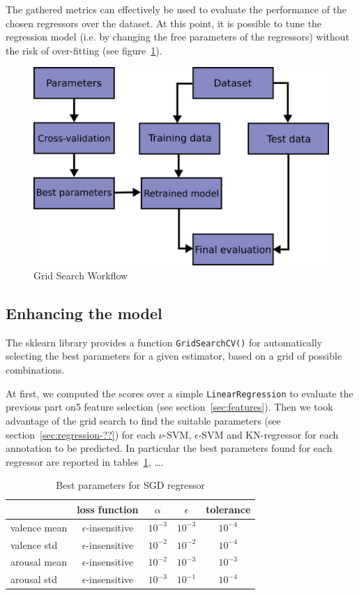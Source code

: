 The gathered metrics can effectively be used to evaluate the performance of the chosen regressors over the dataset.
At this point, it is possible to tune the regression model (i.e. by changing the free parameters of the regressors) without the risk of over-fitting (see figure~\ref{fig:grid-search-workflow}).

\begin{figure}
	\centering
	\includegraphics[width=0.5\linewidth]{assets/grid_search_workflow.png}
	\caption{Grid Search Workflow \cite{sklearn-crossval}}
	\label{fig:grid-search-workflow}
\end{figure}


\subsection{Enhancing the model}\label{sec:enhance-model}

The sklearn library provides a function \texttt{GridSearchCV()} for automatically selecting the best parameters for a given estimator, based on a grid of possible combinations.

At first, we computed the scores over a simple \texttt{LinearRegression} to evaluate the previous part on5 feature selection (see section~\ref{sec:features}).
Then we took advantage of the grid search to find the suitable parameters (see section~\ref{sec:regression-??}) for each $\nu$-SVM, $\epsilon$-SVM and KN-regressor for each annotation to be predicted.
In particular the best parameters found for each regressor are reported in tables~\ref{table:cross-params-sgd}, \dots.

\begin{table}
	\centering
	\begin{tabular}{lcccc}
		\toprule
		& loss function & $\alpha$ & $\epsilon$ & tolerance \\
		\midrule
		valence mean & $\epsilon$-insensitive & $10^{-3}$ & $10^{-3}$ & $10^{-4}$ \\
		valence std & $\epsilon$-insensitive & $10^{-2}$ & $10^{-2}$ & $10^{-4}$ \\
		arousal mean & $\epsilon$-insensitive & $10^{-2}$ & $10^{-3}$ & $10^{-3}$ \\
		arousal std & $\epsilon$-insensitive & $10^{-3}$ & $10^{-1}$ & $10^{-4}$ \\
		\bottomrule
	\end{tabular}
	\caption{Best parameters for SGD regressor}
	\label{table:cross-params-sgd}
\end{table}

